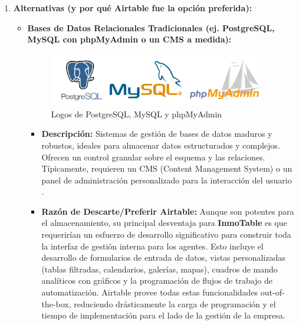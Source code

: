 \begin{enumerate}
    \item \textbf{Alternativas (y por qué Airtable fue la opción preferida):}
    
    \begin{itemize}

        \item \textbf{Bases de Datos Relacionales Tradicionales (ej. PostgreSQL, MySQL con phpMyAdmin o un CMS a medida):}

        \begin{figure}[H]
            \begin{center}
                \includegraphics[width = 0.95\textwidth]{Figuras/logospostgresqlmysqlphpmyadmin.png}
            \end{center}
            \caption{\label{fig:logospostgresqlmysqlphpmyadmin} Logos de PostgreSQL, MySQL y phpMyAdmin}
        \end{figure}
        
        \begin{itemize}
            \item \textbf{Descripción:} Sistemas de gestión de bases de datos maduros y robustos, ideales para almacenar datos estructurados y complejos. Ofrecen un control granular sobre el esquema y las relaciones. Típicamente, requieren un CMS (Content Management System) o un panel de administración personalizado para la interacción del usuario \cite{ionos2024postgresql}.
            \item \textbf{Razón de Descarte/Preferir Airtable:} Aunque son potentes para el almacenamiento, su principal desventaja para \textbf{InmoTable} es que requerirían un esfuerzo de desarrollo significativo para construir toda la interfaz de gestión interna para los agentes. Esto incluye el desarrollo de formularios de entrada de datos, vistas personalizadas (tablas filtradas, calendarios, galerías, mapas), cuadros de mando analíticos con gráficos y la programación de flujos de trabajo de automatización. Airtable provee todas estas funcionalidades out-of-the-box, reduciendo drásticamente la carga de programación y el tiempo de implementación para el lado de la gestión de la empresa.
        \end{itemize}


\end{itemize}
\end{enumerate}
